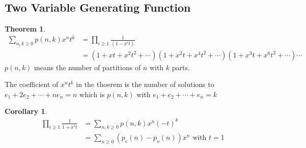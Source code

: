 \documentclass{article}
\theoremstyle{definition}
\newtheorem{thm}{Theorem}[]
\newtheorem{cor}{Corollary}
\newenvironment{pf*}{\pushQED{\qed}\pf}{\popQED\endpf}
\begin{document}
\subsection{Two Variable Generating Function}
\begin{thm}
    \begin{align*}
        \sum_{n, k \ge 0} p(n, k) x^n t^k &= \prod_{i\ge 1} \frac{1}{(1-x^i t)} \\ 
        &= (1+xt+x^2 t^2 + \cdots )(1+x^2t + x^4 t^2 + \cdots )(1+x^3 t + x^6 t^2+ \cdots) \cdots 
    \end{align*}
    $p(n,k)$ means the number of partitions of $n$ with $k$ parts. 
\end{thm}
\begin{pf*}
    The coefficient of $x^n t^k$ in the thoerem is the number of 
    solutions to $e_1 + 2e_2 + \cdots + ne_n = n$ which is $p(n, k)$ with 
    $e_1 + e_2 + \cdots + e_n = k$ 
\end{pf*}
\begin{cor}
    \begin{align*}
        \prod_{i\ge 1} \frac{1}{1+x^i t} &= \sum_{n, k \ge 0} p(n, k) 
        x^n (-t)^k \\ 
        &= \sum_{n \ge 0 } \left(p_e(n) - p_o(n)\right) x^n \text{ with } t = 1
    \end{align*}
\end{cor}
\end{document}

